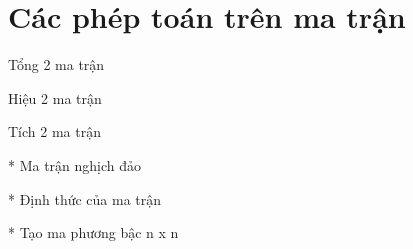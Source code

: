\section{Các phép toán trên ma trận}
\begin{problem}
    Tổng 2 ma trận
\end{problem}
\begin{problem}
    Hiệu 2 ma trận
\end{problem}
\begin{problem}
    Tích 2 ma trận
\end{problem}
\begin{problem}
    * Ma trận nghịch đảo
\end{problem}
\begin{problem}
    * Định thức của ma trận
\end{problem}
\begin{problem}
    * Tạo ma phương bậc n x n
\end{problem}

